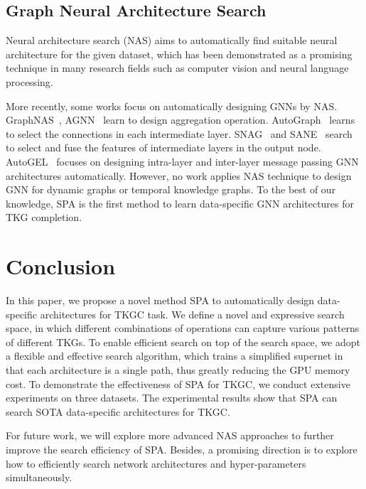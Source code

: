 \documentclass[11pt]{article}
\begin{document}
\subsection{Graph Neural Architecture Search}

Neural architecture search (NAS) aims to automatically find suitable neural architecture for the given dataset, 
which has been demonstrated as a promising technique in many research fields such as computer vision and neural language processing. 

More recently, 
some works focus on automatically designing GNNs by NAS. 
GraphNAS~\citep{gao2021graph}, AGNN~\citep{zhou2019auto} learn to design aggregation operation. 
AutoGraph~\citep{li2020autograph} learns to select the connections in each intermediate layer. 
SNAG~\citep{zhao2020simplifying} and SANE~\citep{huan2021search} search to select and fuse the features of intermediate layers in the output node. 
AutoGEL~\citep{wang2021autogel} focuses on designing intra-layer and inter-layer message passing GNN architectures automatically. 
However, 
no work applies NAS technique to design GNN for dynamic graphs or temporal knowledge graphs. 
To the best of our knowledge, 
SPA is the first method to learn data-specific GNN architectures for TKG completion.

\section{Conclusion}

In this paper, 
we propose a novel method SPA to automatically design data-specific architectures for TKGC task. We define a novel and expressive search space, 
in which different combinations of operations can capture various patterns of different TKGs. 
To enable efficient search on top of the search space, 
we adopt a flexible and effective search algorithm, 
which trains a simplified supernet in that each architecture is a single path, 
thus greatly reducing the GPU memory cost. 
To demonstrate the effectiveness of SPA for TKGC, 
we conduct extensive experiments on three datasets. 
The experimental results show that SPA can search SOTA data-specific architectures for TKGC.

For future work, 
we will explore more advanced NAS approaches to further improve the search efficiency of SPA. 
Besides, 
a promising direction is to explore how to efficiently search network architectures and hyper-parameters simultaneously.

\clearpage
\end{document}
